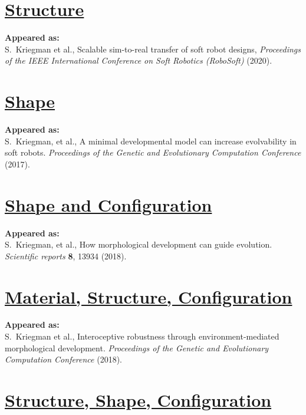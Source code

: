 


\chapter[Structure]{\href{https://ieeexplore.ieee.org/abstract/document/9116004}{\color{blue}Structure}}

\textbf{Appeared as:}\\
S.~Kriegman et al.,
Scalable sim-to-real transfer of soft robot designs,
\textit{Proceedings of the IEEE International Conference on Soft Robotics (RoboSoft)} (2020).


\chapter[Shape]{\href{https://dl.acm.org/doi/abs/10.1145/3071178.3071296}{\color{blue}Shape}}

\textbf{Appeared as:}\\
S.~Kriegman, et al., A minimal developmental model can increase evolvability in soft robots. \textit{Proceedings of the Genetic and Evolutionary Computation Conference} (2017).


\chapter[Shape and Configuration]{\href{https://www.nature.com/articles/s41598-018-31868-7}{\color{blue}Shape and Configuration}}

\textbf{Appeared as:}\\
S.~Kriegman, et al., How morphological development can guide evolution. \textit{Scientific reports} \textbf{8}, 13934 (2018).


\chapter[Material, Structure, Configuration]{\href{https://arxiv.org/abs/1804.02257}{\color{blue}Material, Structure, Configuration}}

\textbf{Appeared as:}\\
S.~Kriegman et al., Interoceptive robustness through environment-mediated morphological development. \textit{Proceedings of the Genetic and Evolutionary Computation Conference} (2018).


\chapter[Structure, Shape, Configuration]{\href{http://www.roboticsproceedings.org/rss15/p28.html}{\color{blue}Structure, Shape, Configuration}}

